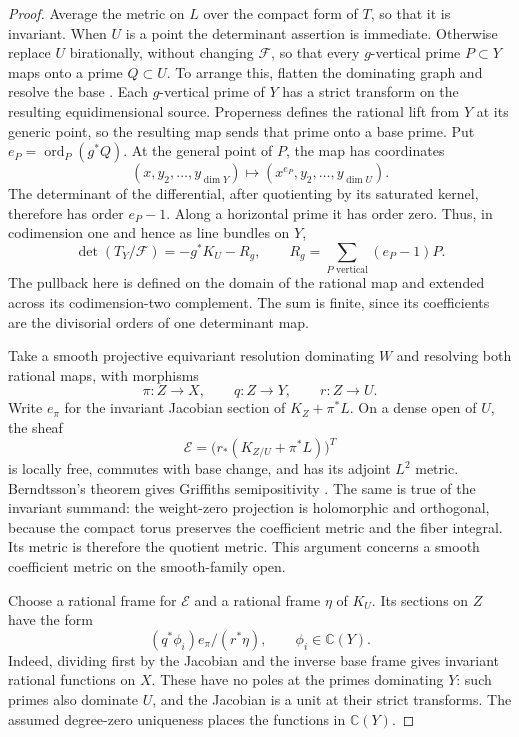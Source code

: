 \begin{proof}
Average the metric on \(L\) over the compact form of \(T\), so that
it is invariant.  When \(U\) is a point the determinant assertion is
immediate.  Otherwise replace \(U\) birationally, without changing
\(\mathcal F\), so that every \(g\)-vertical prime \(P\subset Y\)
maps onto a prime \(Q\subset U\).  To arrange this, flatten the
dominating graph and resolve the base \cite{RaynaudGruson1971}.
Each $g$-vertical prime of $Y$ has a strict transform on the
resulting equidimensional source. Properness defines the rational
lift from $Y$ at its generic point, so the resulting map sends
that prime onto a base prime. Put
\(e_P=\operatorname{ord}_P(g^*Q)\).  At the general point of \(P\),
the map has coordinates
\[
 (x,y_2,\ldots,y_{\dim Y})
 \longmapsto (x^{e_P},y_2,\ldots,y_{\dim U}).
\]
The determinant of the differential, after quotienting by its
saturated kernel, therefore has order \(e_P-1\).  Along a horizontal
prime it has order zero.  Thus, in codimension one and hence as line
bundles on \(Y\),
\begin{equation}\label{g:cf:evaluation-determinant}
 \det(T_Y/\mathcal F)=-g^*K_U-R_g,
 \qquad R_g=\sum_{P\text{ vertical}}(e_P-1)P.
\end{equation}
The pullback here is defined on the domain of the rational map and
extended across its codimension-two complement.  The sum is finite,
since its coefficients are the divisorial orders of one determinant
map.

Take a smooth projective equivariant resolution dominating \(W\)
and resolving both rational maps, with morphisms
\[
 \pi:Z\longrightarrow X,\qquad q:Z\longrightarrow Y,
 \qquad r:Z\longrightarrow U.
\]
Write \(e_\pi\) for the invariant Jacobian section of
\(K_Z+\pi^*L\).  On a dense open of \(U\), the sheaf
\[
 \mathcal E=\bigl(r_*(K_{Z/U}+\pi^*L)\bigr)^T
\]
is locally free, commutes with base change, and has its adjoint
\(L^2\) metric.  Berndtsson's theorem gives Griffiths semipositivity
\cite{Berndtsson2009}.  The same is true of the invariant summand:
the weight-zero projection is holomorphic and orthogonal, because
the compact torus preserves the coefficient metric and the fiber
integral.  Its metric is therefore the quotient metric.  This
argument concerns a smooth coefficient metric on the smooth-family
open.

Choose a rational frame for \(\mathcal E\) and a rational frame
\(\eta\) of \(K_U\).  Its sections on \(Z\) have the form
\begin{equation}\label{g:cf:evaluation-coefficients}
 (q^*\phi_i)e_\pi/(r^*\eta),\qquad
 \phi_i\in\mathbb C(Y).
\end{equation}
Indeed, dividing first by the Jacobian and the inverse base frame
gives invariant rational functions on \(X\).  These have no poles
at the primes dominating \(Y\): such primes also dominate \(U\),
and the Jacobian is a unit at their strict transforms.  The assumed
degree-zero uniqueness places the functions in \(\mathbb C(Y)\).


\end{proof}
